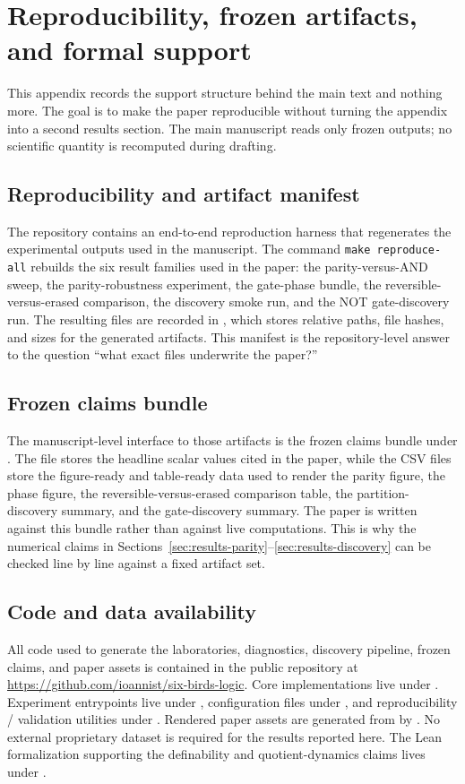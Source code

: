 \documentclass[11pt]{article}
\theoremstyle{definition}
\begin{document}
\section{Reproducibility, frozen artifacts, and formal support}
\label{sec:appendix}

This appendix records the support structure behind the main text and nothing more. The goal is to make the paper reproducible without turning the appendix into a second results section. The main manuscript reads only frozen outputs; no scientific quantity is recomputed during drafting.

\subsection{Reproducibility and artifact manifest}
The repository contains an end-to-end reproduction harness that regenerates the experimental outputs used in the manuscript. The command \texttt{make reproduce-all} rebuilds the six result families used in the paper: the parity-versus-AND sweep, the parity-robustness experiment, the gate-phase bundle, the reversible-versus-erased comparison, the discovery smoke run, and the NOT gate-discovery run. The resulting files are recorded in , which stores relative paths, file hashes, and sizes for the generated artifacts. This manifest is the repository-level answer to the question ``what exact files underwrite the paper?''

\subsection{Frozen claims bundle}
The manuscript-level interface to those artifacts is the frozen claims bundle under . The file  stores the headline scalar values cited in the paper, while the CSV files store the figure-ready and table-ready data used to render the parity figure, the phase figure, the reversible-versus-erased comparison table, the partition-discovery summary, and the gate-discovery summary. The paper is written against this bundle rather than against live computations. This is why the numerical claims in Sections~\ref{sec:results-parity}--\ref{sec:results-discovery} can be checked line by line against a fixed artifact set.

\subsection{Code and data availability}
All code used to generate the laboratories, diagnostics, discovery pipeline, frozen claims, and paper assets is contained in the public repository at \url{https://github.com/ioannist/six-birds-logic}. Core implementations live under . Experiment entrypoints live under , configuration files under , and reproducibility / validation utilities under . Rendered paper assets are generated from  by . No external proprietary dataset is required for the results reported here. The Lean formalization supporting the definability and quotient-dynamics claims lives under .
\end{document}
